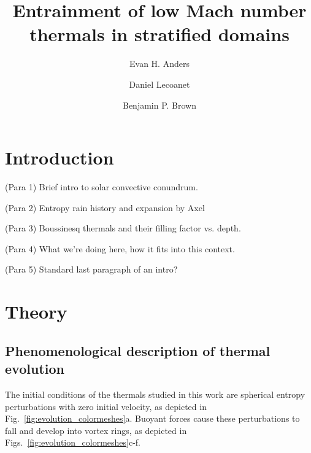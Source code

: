 \documentclass[twocolumn, amsmath, amsfonts, amssymb, trackchanges]{aastex62}
\begin{document}
\title{Entrainment of low Mach number thermals in stratified domains}


\author[0000-0002-3433-4733]{Evan H. Anders}
\author[0000-0002-7635-9728]{Daniel Lecoanet}
\author[0000-0001-8935-219X]{Benjamin P. Brown}


\begin{abstract}
\end{abstract}


\section{Introduction}
\label{sec:intro}
(Para 1) Brief intro to solar convective conundrum.

(Para 2) Entropy rain history and expansion by Axel

(Para 3) Boussinesq thermals and their filling factor vs. depth.

(Para 4) What we're doing here, how it fits into this context.

(Para 5) Standard last paragraph of an intro?

\section{Theory}
\label{sec:theory}

\subsection{Phenomenological description of thermal evolution}
The initial conditions of the thermals studied in this work are spherical
entropy perturbations with zero initial velocity, as depicted in 
Fig.~\ref{fig:evolution_colormeshes}a. Buoyant forces cause these perturbations
to fall and develop into vortex rings, as depicted in 
Figs.~\ref{fig:evolution_colormeshes}c-f.
\end{document}
